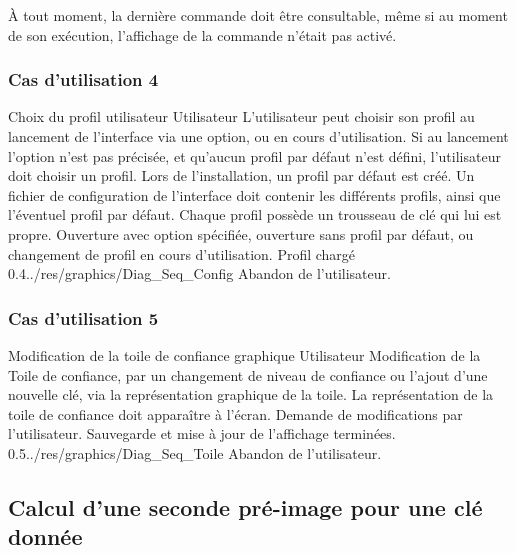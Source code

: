 \documentclass{../res/univ-projet}
\begin{document}
\`{A} tout moment, la dernière commande doit être consultable, même si au moment de son exécution, l'affichage de la commande n'était pas activé.


\subsubsection{Cas d'utilisation 4}
\ficheGraphic
{Choix du profil utilisateur}
{Utilisateur}
{L'utilisateur peut choisir son profil au lancement de l'interface via une option, ou en cours d'utilisation. Si au lancement l'option n'est pas précisée, et qu'aucun profil par défaut n'est défini, l'utilisateur doit choisir un profil. Lors de l'installation, un profil par défaut est créé.}
{Un fichier de configuration de l'interface doit contenir les différents profils, ainsi que l'éventuel profil par défaut. 
Chaque profil possède un trousseau de clé qui lui est propre.}
{Ouverture avec option spécifiée, ouverture sans profil par défaut, ou changement de profil en cours d'utilisation.}
{Profil chargé}
{0.4}{../res/graphics/Diag_Seq_Config}
{Abandon de l'utilisateur.}
\vspace{0.5cm}


\subsubsection{Cas d'utilisation 5}
\ficheGraphic
{Modification de la toile de confiance graphique}         
{Utilisateur}
{Modification de la Toile de confiance, par un changement de niveau de confiance ou l'ajout d'une nouvelle clé, via la représentation graphique de la toile.}
{La représentation de la toile de confiance doit apparaître à l'écran.}
{Demande de modifications par l'utilisateur.}
{Sauvegarde et mise à jour de l'affichage terminées.}
{0.5}{../res/graphics/Diag_Seq_Toile}
{Abandon de l'utilisateur.}                      
\vspace{0.5cm}
  

\subsection{Calcul d'une seconde pré-image pour une clé donnée}
  
\end{document}
